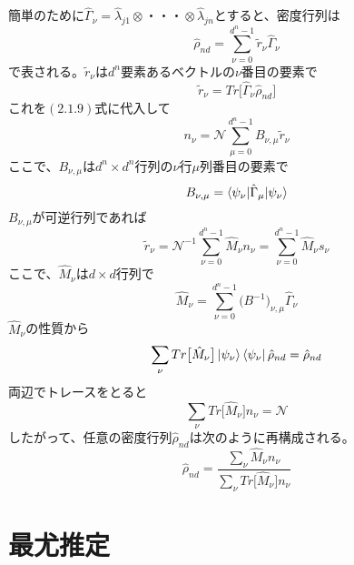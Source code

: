 \documentclass[11pt,a4j,notitlepage]{jreport}
\begin{document}
	簡単のために$\hat{\Gamma}_\nu = \hat{\lambda}_{j 1} \otimes ・・・ \otimes \hat{\lambda}_{j n}$とすると、密度行列は
	\begin{equation}
		\hat{\rho}_{n d} = \sum_{\nu = 0}^{d^n - 1} \tilde{r}_\nu \hat{\Gamma}_\nu
	\end{equation}
	で表される。$\tilde{r}_\nu$は$d^n$要素あるベクトルの$\nu$番目の要素で
	\begin{equation}
		\tilde{r}_\nu = Tr \big[ \hat{\Gamma}_\nu \hat{\rho}_{n d} \big]
	\end{equation}
	これを$(2.1.9)$式に代入して
	\begin{equation}
		n_\nu = \mathcal{N} \sum_{\mu = 0}^{d^n - 1} B_{\nu, \mu} \tilde{r}_\nu
	\end{equation}
	ここで、$B_{\nu, \mu}$は$d^n \times d^n$行列の$\nu$行$\mu$列番目の要素で
	\begin{equation}
		B_{\nu, \mu} = \braket{\psi_\nu | \hat{\Gamma}_\mu | \psi_\nu}
	\end{equation}
	$B_{\nu, \mu}$が可逆行列であれば
	\begin{equation}
		\tilde{r}_\nu = \mathcal{N}^{-1} \sum_{\nu = 0}^{d^n - 1} \hat{M}_\nu n_\nu = \sum_{\nu = 0}^{d^n - 1} \hat{M}_\nu s_\nu
	\end{equation}
	ここで、$\hat{M}_\nu$は$d \times d$行列で
	\begin{equation}
		\hat{M}_\nu = \sum_{\nu = 0}^{d^n - 1} \big( B^{-1} \big)_{\nu, \mu} \hat{\Gamma}_\nu
	\end{equation}
	$\hat{M}_\nu$の性質から
	\begin{equation}
		\sum_\nu Tr \big[ \hat{M}_\nu \big] \ket{\psi_\nu} \bra{\psi_\nu} \hat{\rho}_{n d} = \hat{\rho}_{n d}
	\end{equation}
	両辺でトレースをとると
	\begin{equation}
		\sum_\nu Tr \big[ \hat{M}_\nu \big] n_\nu = \mathcal{N}
	\end{equation}
	したがって、任意の密度行列$\hat{\rho}_{n d}$は次のように再構成される。
	\begin{equation}
		\hat{\rho}_{n d} = \frac{\sum_\nu \hat{M}_\nu n_\nu}{\sum_\nu Tr \big[ \hat{M}_\nu \big] n_\nu} 
	\end{equation}


	\section{最尤推定}
\end{document}
